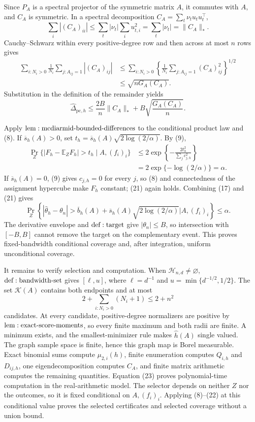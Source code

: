 Since \(P_A\) is a spectral projector of the symmetric matrix \(A\), it commutes with \(A\), and \(C_A\) is symmetric.  In a spectral decomposition \(C_A=\sum_t\nu_tu_tu_t^\top\),
\[
 \sum_i|(C_A)_{ii}|
 \leq\sum_t|\nu_t|\sum_i u_{t,i}^2
 =\sum_t|\nu_t|=\|C_A\|_*.
\tag{18}
\]
Cauchy--Schwarz within every positive-degree row and then across at most \(n\) rows gives
\[
\begin{aligned}
 \sum_{i:N_i>0}\frac1{N_i}\sum_{j:A_{ij}=1}|(C_A)_{ij}|
 &\leq\sum_{i:N_i>0}
 \left\{\frac1{N_i}\sum_{j:A_{ij}=1}(C_A)_{ij}^2\right\}^{1/2}\\
 &\leq\sqrt{nG_A(C_A)}.
\end{aligned}
\tag{19}
\]
Substitution in the definition of the remainder yields
\[
 \widehat\Delta_{\mathrm{pc},h}
 \leq\frac{2B}{n}\|C_A\|_*+B\sqrt{\frac{G_A(C_A)}n}.
\tag{20}
\]

Apply \({\rm lem:mcdiarmid\text{-}bounded\text{-}differences}\) to the conditional product law and (8).  If \(\overline s_h(A)>0\), set \(t_h=\overline s_h(A)\sqrt{2\log(2/\alpha)}\).  By (9),
\[
\begin{aligned}
 \Pr_Z\{|F_h-\mathbb E_ZF_h|>t_h\mid A,(f_i)_i\}
 &\leq2\exp\left\{-\frac{2t_h^2}{\sum_jc_{j,h}^2}\right\}\\
 &=2\exp\{-\log(2/\alpha)\}=\alpha.
\end{aligned}
\tag{21}
\]
If \(\overline s_h(A)=0\), (9) gives \(c_{j,h}=0\) for every \(j\), so (8) and connectedness of the assignment hypercube make \(F_h\) constant; (21) again holds.  Combining (17) and (21) gives
\[
 \Pr_Z\!\left\{
 |\widehat\theta_h-\theta_n|>
 \overline b_h(A)+\overline s_h(A)\sqrt{2\log(2/\alpha)}
 \mathrel{\Big|}A,(f_i)_i\right\}\leq\alpha.
\tag{22}
\]
The derivative envelope and \({\rm def:target}\) give \(|\theta_n|\leq B\), so intersection with \([-B,B]\) cannot remove the target on the complementary event.  This proves fixed-bandwidth conditional coverage and, after integration, uniform unconditional coverage.

It remains to verify selection and computation.  When \(\mathcal H_{n,d}\ne\varnothing\), \({\rm def:bandwidth\text{-}set}\) gives \([\ell,u]\), where \(\ell=d^{-1}\) and \(u=\min\{d^{-1/2},1/2\}\).  The set \(\mathcal K(A)\) contains both endpoints and at most
\[
 2+\sum_{i:N_i>0}(N_i+1)\leq2+n^2
\tag{23}
\]
candidates.  At every candidate, positive-degree normalizers are positive by \({\rm lem:exact\text{-}score\text{-}moments}\), so every finite maximum and both radii are finite.  A minimum exists, and the smallest-minimizer rule makes \(\widehat h(A)\) single valued.  The graph sample space is finite, hence this graph map is Borel measurable.  Exact binomial sums compute \(\mu_{2,i}(h)\), finite enumeration computes \(Q_{i,h}\) and \(D_{ij,h}\), one eigendecomposition computes \(C_A\), and finite matrix arithmetic computes the remaining quantities.  Equation (23) proves polynomial-time computation in the real-arithmetic model.  The selector depends on neither \(Z\) nor the outcomes, so it is fixed conditional on \(A,(f_i)_i\).  Applying (8)--(22) at this conditional value proves the selected certificates and selected coverage without a union bound.

